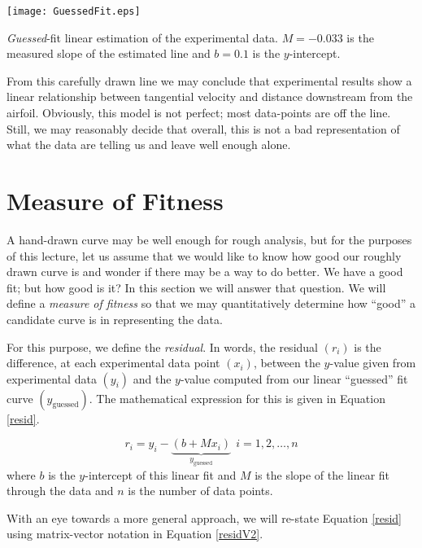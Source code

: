 \begin{marginfigure}
\texttt{[image: GuessedFit.eps]}
\caption{\emph{Guessed}-fit linear estimation of the experimental data.  $M =
  -0.033$ is the measured slope of the estimated line and $b = 0.1$ is the $y$-intercept.}
\label{fig:lec13n-guessedfit}
\end{marginfigure}  

From this carefully drawn line we may conclude that experimental results show a linear
relationship between tangential velocity and distance downstream from the
airfoil.  Obviously, this model is not perfect; most data-points are off the
line.  Still, we may reasonably decide that overall, this is not a bad
representation of what the data are telling us and leave well enough alone.

\section{Measure of Fitness}

A hand-drawn curve may be well enough for rough analysis, but for the purposes of this lecture, let us assume that we would like to know how good our roughly drawn curve is and wonder if there may be a way to do better.  We have a good fit; but how good is it?  In this section we will answer that question.  We will define a \emph{measure of fitness} so that we may quantitatively determine how ``good'' a candidate curve is in representing the data.

 
For this purpose, we define the \emph{residual}.  In words, the residual $(r_i)$ is the
difference, at each experimental data point $(x_i)$, between the $y$-value given from experimental data $(y_i)$ and the $y$-value computed from our linear ``guessed'' fit curve $\left(y_{\text{guessed}}\right)$.  The mathematical expression for this is given in Equation \ref{resid}.

\begin{equation}
r_{i} = y_{i} - \underbrace{\left(b + Mx_{i}\right)}_{y_{\text{guessed}}} \ \ i = 1,2,\dots,n
\label{resid}
\end{equation}
where $b$ is the $y$-intercept of this linear fit and $M$ is the slope of
the linear fit through the data
and $n$ is the number of data points.

With an eye towards a more general approach, we will re-state Equation \ref{resid} using matrix-vector notation in Equation \ref{residV2}.

